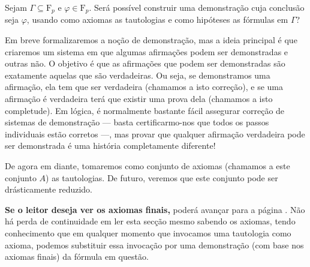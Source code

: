 \documentclass{report}
\theoremstyle{definition}
\theoremstyle{remark}
\newcommand{\F}{\mathrm{F}}
\begin{document}
	\begin{center}
	Sejam $\Gamma \subseteq \F_p$ e $\varphi \in \F_p$. Será possível construir uma demonstração cuja conclusão seja $\varphi$, usando como axiomas as tautologias e como hipóteses as fórmulas em $\Gamma$?
	\end{center}
	
	Em breve formalizaremos a noção de demonstração, mas a ideia principal é que criaremos um sistema em que algumas afirmações podem ser demonstradas e outras não. O objetivo é que as afirmações que podem ser demonstradas são exatamente aquelas que são verdadeiras. Ou seja, se demonstramos uma afirmação, ela tem que ser verdadeira (chamamos a isto correção), e se uma afirmação é verdadeira terá que existir uma prova dela (chamamos a isto completude). Em lógica, é normalmente bastante fácil assegurar correção de sistemas de demonstração --- basta certificarmo-nos que todos os passos individuais estão corretos ---, mas provar que qualquer afirmação verdadeira pode ser demonstrada é uma história completamente diferente!
	
	De agora em diante, tomaremos como conjunto de axiomas (chamamos a este conjunto $A$) as tautologias. De futuro, veremos que este conjunto pode ser drásticamente reduzido.
	
	\textbf{Se o leitor deseja ver os axiomas finais,} poderá avançar para a página \pageref{def:prop:ax}. Não há perda de continuidade em ler esta secção mesmo sabendo os axiomas, tendo conhecimento que em qualquer momento que invocamos uma tautologia como axioma, podemos substituir essa invocação por uma demonstração (com base nos axiomas finais) da fórmula em questão.
	
\end{document}

